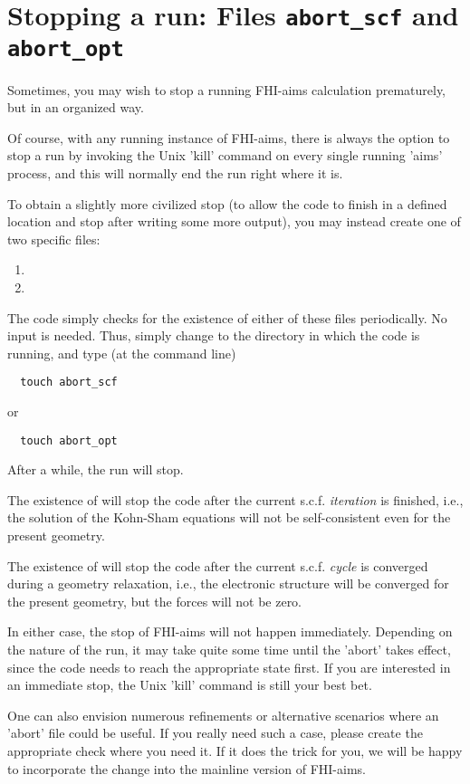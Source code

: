\section{Stopping a run: Files \texttt{abort\_scf} and \texttt{abort\_opt}}
\label{section:abort}

Sometimes, you may wish to stop a running FHI-aims calculation
prematurely, but in an organized way.

Of course, with any running instance of FHI-aims, there is always the
option to stop a run by invoking the Unix 'kill' command on every
single running 'aims' process, and this will normally end the run
right where it is.

To obtain a slightly more civilized stop (to allow the code to finish
in a defined location and stop after writing some more output), you
may instead create one of two specific files:
\begin{enumerate}
  \item {}
  \item {}
\end{enumerate}
The code simply checks for the existence of either of these files
periodically. No input is needed. Thus, simply change to the directory
in which the code is running, and type (at the command line)
\begin{verbatim}
  touch abort_scf
\end{verbatim}
or
\begin{verbatim}
  touch abort_opt
\end{verbatim}
After a while, the run will stop.

The existence of  will stop the code after the
current s.c.f. \emph{iteration} is finished, i.e., the solution of the
Kohn-Sham equations will not be self-consistent even for the present
geometry.

The existence of  will stop the code after the
current s.c.f. \emph{cycle} is converged during a geometry relaxation,
i.e., the electronic structure will be converged for the present
geometry, but the forces will not be zero.

In either case, the stop of FHI-aims will not happen
immediately. Depending on the nature of the run, it may take quite
some time until the 'abort' takes effect, since the code needs to
reach the appropriate state first. If you are interested in an
immediate stop, the Unix 'kill' command is still your best bet.

One can also envision numerous refinements or alternative
scenarios where an 'abort' file could be useful. If you really need
such a case, please create the appropriate check where you need it. If
it does the trick for you, we will be happy to incorporate the change
into the mainline version of FHI-aims.

